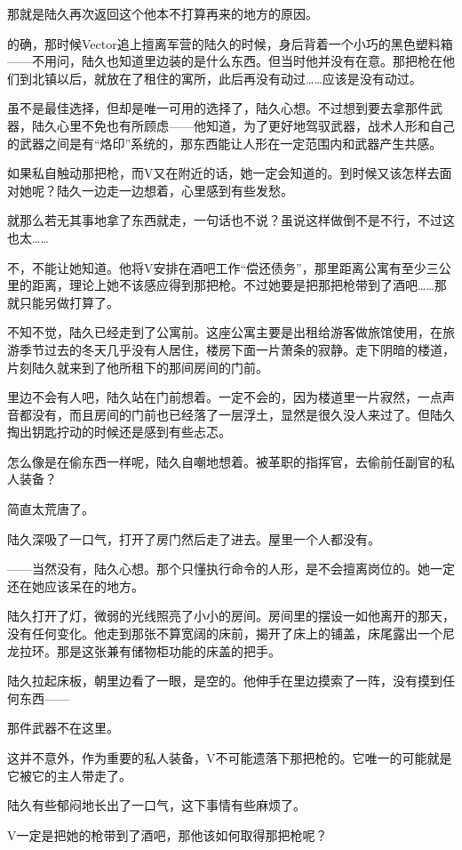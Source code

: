 那就是陆久再次返回这个他本不打算再来的地方的原因。

的确，那时候Vector追上擅离军营的陆久的时候，身后背着一个小巧的黑色塑料箱——不用问，陆久也知道里边装的是什么东西。但当时他并没有在意。那把枪在他们到北镇以后，就放在了租住的寓所，此后再没有动过……应该是没有动过。

虽不是最佳选择，但却是唯一可用的选择了，陆久心想。不过想到要去拿那件武器，陆久心里不免也有所顾虑——他知道，为了更好地驾驭武器，战术人形和自己的武器之间是有“烙印”系统的，那东西能让人形在一定范围内和武器产生共感。

如果私自触动那把枪，而V又在附近的话，她一定会知道的。到时候又该怎样去面对她呢？陆久一边走一边想着，心里感到有些发愁。

就那么若无其事地拿了东西就走，一句话也不说？虽说这样做倒不是不行，不过这也太……

不，不能让她知道。他将V安排在酒吧工作“偿还债务”，那里距离公寓有至少三公里的距离，理论上她不该感应得到那把枪。不过她要是把那把枪带到了酒吧……那就只能另做打算了。

不知不觉，陆久已经走到了公寓前。这座公寓主要是出租给游客做旅馆使用，在旅游季节过去的冬天几乎没有人居住，楼房下面一片萧条的寂静。走下阴暗的楼道，片刻陆久就来到了他所租下的那间房间的门前。

里边不会有人吧，陆久站在门前想着。一定不会的，因为楼道里一片寂然，一点声音都没有，而且房间的门前也已经落了一层浮土，显然是很久没人来过了。但陆久掏出钥匙拧动的时候还是感到有些忐忑。

怎么像是在偷东西一样呢，陆久自嘲地想着。被革职的指挥官，去偷前任副官的私人装备？

简直太荒唐了。

陆久深吸了一口气，打开了房门然后走了进去。屋里一个人都没有。

——当然没有，陆久心想。那个只懂执行命令的人形，是不会擅离岗位的。她一定还在她应该呆在的地方。

陆久打开了灯，微弱的光线照亮了小小的房间。房间里的摆设一如他离开的那天，没有任何变化。他走到那张不算宽阔的床前，揭开了床上的铺盖，床尾露出一个尼龙拉环。那是这张兼有储物柜功能的床盖的把手。

陆久拉起床板，朝里边看了一眼，是空的。他伸手在里边摸索了一阵，没有摸到任何东西——

那件武器不在这里。

这并不意外，作为重要的私人装备，V不可能遗落下那把枪的。它唯一的可能就是它被它的主人带走了。

陆久有些郁闷地长出了一口气，这下事情有些麻烦了。

V一定是把她的枪带到了酒吧，那他该如何取得那把枪呢？

